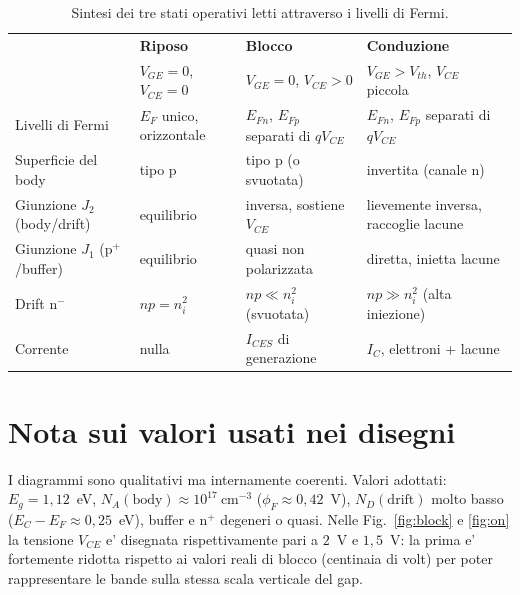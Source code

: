 \documentclass[11pt,a4paper]{article}
\begin{document}
\begin{table}[H]
\centering
\footnotesize
\begin{tabular}{@{}p{}p{}p{}p{}@{}}
\toprule
 & \textbf{Riposo} & \textbf{Blocco} & \textbf{Conduzione}\\
 & $V_{GE}=0$, $V_{CE}=0$ & $V_{GE}=0$, $V_{CE}>0$ & $V_{GE}>V_{th}$, $V_{CE}$ piccola\\
\midrule
Livelli di Fermi & $E_F$ unico, orizzontale & $E_{Fn}$, $E_{Fp}$ separati di $qV_{CE}$ & $E_{Fn}$, $E_{Fp}$ separati di $qV_{CE}$\\
Superficie del body & tipo p & tipo p (o svuotata) & invertita (canale n)\\
Giunzione $J_2$ (body/drift) & equilibrio & inversa, sostiene $V_{CE}$ & lievemente inversa, raccoglie lacune\\
Giunzione $J_1$ ($\mathrm{p^{+}}$/buffer) & equilibrio & quasi non polarizzata & diretta, inietta lacune\\
Drift $\mathrm{n^{-}}$ & $np=n_i^2$ & $np \ll n_i^2$ (svuotata) & $np \gg n_i^2$ (alta iniezione)\\
Corrente & nulla & $I_{CES}$ di generazione & $I_C$, elettroni + lacune\\
\bottomrule
\end{tabular}
\caption{Sintesi dei tre stati operativi letti attraverso i livelli di Fermi.}
\end{table}

\section*{Nota sui valori usati nei disegni}
\small
I diagrammi sono qualitativi ma internamente coerenti. Valori adottati:
$E_g = 1{,}12$~eV, $N_A(\text{body}) \approx 10^{17}~\mathrm{cm^{-3}}$
($\phi_F \approx 0{,}42$~V), $N_D(\text{drift})$ molto basso
($E_C-E_F \approx 0{,}25$~eV), buffer e $\mathrm{n^{+}}$ degeneri o quasi.
Nelle Fig.~\ref{fig:block} e \ref{fig:on} la tensione $V_{CE}$ e' disegnata
rispettivamente pari a $2$~V e $1{,}5$~V: la prima e' fortemente ridotta
rispetto ai valori reali di blocco (centinaia di volt) per poter rappresentare
le bande sulla stessa scala verticale del gap.
\end{document}
